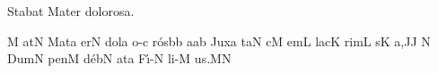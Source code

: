 \def\intralink#1{%
  \setbox\linkbox=\hbox{$\smile$}%
  \setbox\wordbox=\hbox{#1}%
  \setbox\linkbox=\hbox to\wd\wordbox{%
    \hss
    \lower\ht\linkbox\hbox{%
      \lower1pt\hbox{%
	\relax
	  \hbox{$\smile$}%
	}}%
    \hss}%
  \dp\linkbox=0pt
  \box\wordbox \llap{\box\linkbox}}


\beginhymn Stabat Mater dolorosa.


\Internote
\initiumgregorianum
{}%
\punctum M\egn
\sgn {}at\punctum N\egn
\spatium
\sgn M{a}t\punctum a\egn
\sgn {}er\punctum N\egn
\spatium
\sgn dol\punctum a\egn
\sgn {}o-\punctum c\egn
\sgn r{\'o}s\bmolle b\punctum b\egn
\sgn {}a{}\punctum a\augmentum b\egn
\spatium
\divisiominor
\spatium
\sgn Jux\punctum a\egn
\sgn ta{}\punctum N\egn
\spatium
{}c\punctum M\egn
\sgn {}em\punctum L\egn
\spatium
\sgn lac\punctum K\egn
\sgn rim\punctum L\egn
{}s\punctum K\egn
\sgn {}a,\punctum J\augmentum J\egn
\spatium
\divisiominor
\custos N
\lineaproxima
\sgn Dum\punctum N\egn
\spatium
\sgn pen\punctum M\egn
\sgn d{\'e}b\punctum N\egn
\sgn {}at\punctum a\egn
\spatium
\sgn F{\'\i}-\punctum N\egn
\sgn li-\punctum M\egn
\sgn {}u{s.}\punctum M\augmentum N\egn
\spatium
\Finisgregoriana

\bigskip

\beginlyrics

